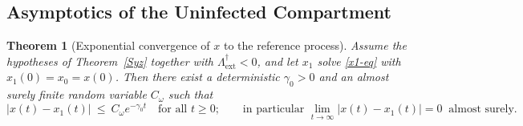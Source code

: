 \documentclass{article}
\newtheorem{theorem}{Theorem}[section]
\newcommand{\Lsharp}{\Lambda_{\mathrm{ext}}^{\dagger}}
\begin{document}
\subsection{Asymptotics of the Uninfected Compartment}

\begin{theorem}[Exponential convergence of $x$ to the reference process]\label{x-x1}
Assume the hypotheses of Theorem~\ref{Syz} together with $\Lsharp<0$, and let $x_1$ solve \eqref{x1-eq} with $x_1(0)=x_0=x(0)$. Then there exist a deterministic $\gamma_0>0$ and an almost surely finite random variable $C_\omega$ such that
\[
|x(t)-x_1(t)|\ \le\ C_\omega e^{-\gamma_0 t}\quad\text{for all }t\ge0;\qquad\text{in particular } \lim_{t\to\infty}|x(t)-x_1(t)|=0\ \text{ almost surely.}
\]
\end{theorem}
\end{document}

